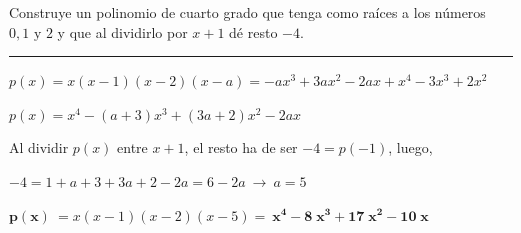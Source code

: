 \begin{miejercicio}

Construye un polinomio de cuarto grado que tenga como raíces a los números $0, 1 \text{ y } 2$ y que al dividirlo por $x+1$ dé resto $-4$.

\rule{250pt}{0.1pt}

$p(x)=x(x-1)(x-2)(x-a)=-a  x^{3} + 3 a x^{2} - 2 a x + x^{4} - 3 x^{3} + 2 x^{2}$

$p(x)=x^4-(a+3)x^3+(3a+2)x^2-2ax$

Al dividir $p(x)$ entre $x+1$, el resto ha de ser $-4=p(-1)$, luego, 

$-4=1+a+3+3a+2-2a=6-2a \ \to \ a=5 $

$\boldsymbol{ p(x)} \ =x(x-1)(x-2)(x-5)= \ \boldsymbol{x^{4} - 8 \; x^{3} + 17 \; x^{2} - 10 \; x}$
	
\end{miejercicio}


\vspace{10mm} %

